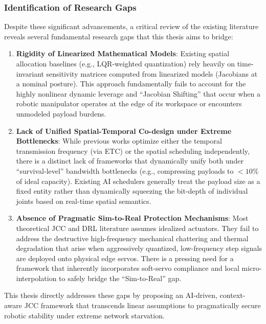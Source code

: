 \subsubsection{Identification of Research Gaps}
Despite these significant advancements, a critical review of the existing literature reveals several fundamental research gaps that this thesis aims to bridge:
\begin{enumerate}
\item \textbf{Rigidity of Linearized Mathematical Models}: Existing spatial allocation baselines (e.g., LQR-weighted quantization) rely heavily on time-invariant sensitivity matrices computed from linearized models (Jacobians at a nominal posture). This approach fundamentally fails to account for the highly nonlinear dynamic leverage and ``Jacobian Shifting'' that occur when a robotic manipulator operates at the edge of its workspace or encounters unmodeled payload burdens.
    \item \textbf{Lack of Unified Spatial-Temporal Co-design under Extreme Bottlenecks}: While previous works optimize either the temporal transmission frequency (via ETC) or the spatial scheduling independently, there is a distinct lack of frameworks that dynamically unify both under ``survival-level'' bandwidth bottlenecks (e.g., compressing payloads to $<10\%$ of ideal capacity). Existing AI schedulers generally treat the payload size as a fixed entity rather than dynamically squeezing the bit-depth of individual joints based on real-time spatial semantics.
    \item \textbf{Absence of Pragmatic Sim-to-Real Protection Mechanisms}: Most theoretical JCC and DRL literature assumes idealized actuators. They fail to address the destructive high-frequency mechanical chattering and thermal degradation that arise when aggressively quantized, low-frequency step signals are deployed onto physical edge servos. There is a pressing need for a framework that inherently incorporates soft-servo compliance and local micro-interpolation to safely bridge the ``Sim-to-Real'' gap.
\end{enumerate}
This thesis directly addresses these gaps by proposing an AI-driven, context-aware JCC framework that transcends linear assumptions to pragmatically secure robotic stability under extreme network starvation.
